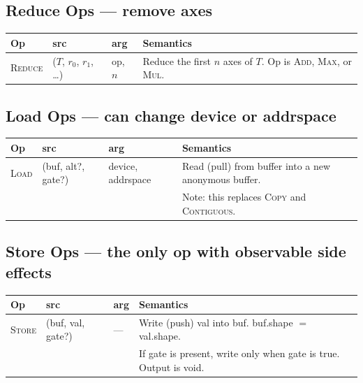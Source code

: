 \documentclass[10pt,letterpaper]{article}
\newcommand{\op}[1]{\textsc{#1}}
\begin{document}
\subsection*{{\color{reducered}Reduce Ops} \normalfont\small--- remove axes}

\begin{tabular}{@{}l l l l@{}}
\toprule
\textbf{Op} & \textbf{src} & \textbf{arg} & \textbf{Semantics} \\
\midrule
\op{Reduce} & ($T$, $r_0$, $r_1$, \ldots) & op, $n$ & Reduce the first $n$ axes of $T$. Op is \op{Add}, \op{Max}, or \op{Mul}. \\
\bottomrule
\end{tabular}

\subsection*{{\color{loadred}Load Ops} \normalfont\small--- can change device or addrspace}

\begin{tabular}{@{}l l l l@{}}
\toprule
\textbf{Op} & \textbf{src} & \textbf{arg} & \textbf{Semantics} \\
\midrule
\op{Load} & (buf, alt?, gate?) & device, addrspace & Read (pull) from buffer into a new anonymous buffer. \\
  & & & Note: this replaces \op{Copy} and \op{Contiguous}. \\
\bottomrule
\end{tabular}

\subsection*{{\color{multipurple}Store Ops} \normalfont\small--- the only op with observable side effects}

\begin{tabular}{@{}l l l l@{}}
\toprule
\textbf{Op} & \textbf{src} & \textbf{arg} & \textbf{Semantics} \\
\midrule
\op{Store} & (buf, val, gate?) & --- & Write (push) val into buf. buf.shape $=$ val.shape. \\
  & & & If gate is present, write only when gate is true. Output is void. \\
\bottomrule
\end{tabular}
\end{document}

